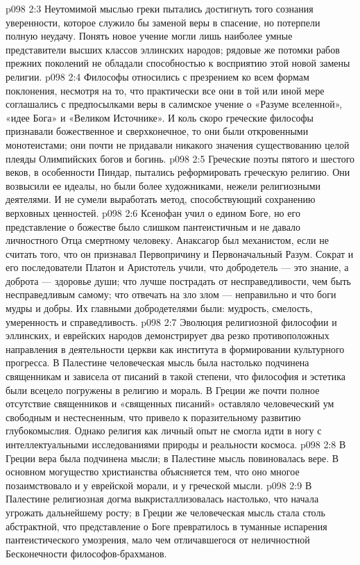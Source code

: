 \vs p098 2:3 Неутомимой мыслью греки пытались достигнуть того сознания уверенности, которое служило бы заменой веры в спасение, но потерпели полную неудачу. Понять новое учение могли лишь наиболее умные представители высших классов эллинских народов; рядовые же потомки рабов прежних поколений не обладали способностью к восприятию этой новой замены религии.
\vs p098 2:4 \pc Философы относились с презрением ко всем формам поклонения, несмотря на то, что практически все они в той или иной мере соглашались с предпосылками веры в салимское учение о «Разуме вселенной», «идее Бога» и «Великом Источнике». И коль скоро греческие философы признавали божественное и сверхконечное, то они были откровенными монотеистами; они почти не придавали никакого значения существованию целой плеяды Олимпийских богов и богинь.
\vs p098 2:5 Греческие поэты пятого и шестого веков, в особенности Пиндар, пытались реформировать греческую религию. Они возвысили ее идеалы, но были более художниками, нежели религиозными деятелями. И не сумели выработать метод, способствующий сохранению верховных ценностей.
\vs p098 2:6 Ксенофан учил о едином Боге, но его представление о божестве было слишком пантеистичным и не давало личностного Отца смертному человеку. Анаксагор был механистом, если не считать того, что он признавал Первопричину и Первоначальный Разум. Сократ и его последователи Платон и Аристотель учили, что добродетель --- это знание, а доброта --- здоровье души; что лучше пострадать от несправедливости, чем быть несправедливым самому; что отвечать на зло злом --- неправильно и что боги мудры и добры. Их главными добродетелями были: мудрость, смелость, умеренность и справедливость.
\vs p098 2:7 \pc Эволюция религиозной философии и эллинских, и еврейских народов демонстрирует два резко противоположных направления в деятельности церкви как института в формировании культурного прогресса. В Палестине человеческая мысль была настолько подчинена священникам и зависела от писаний в такой степени, что философия и эстетика были всецело погружены в религию и мораль. В Греции же почти полное отсутствие священников и «священных писаний» оставляло человеческий ум свободным и нестесненным, что привело к поразительному развитию глубокомыслия. Однако религия как личный опыт не смогла идти в ногу с интеллектуальными исследованиями природы и реальности космоса.
\vs p098 2:8 В Греции вера была подчинена мысли; в Палестине мысль повиновалась вере. В основном могущество христианства объясняется тем, что оно многое позаимствовало и у еврейской морали, и у греческой мысли.
\vs p098 2:9 В Палестине религиозная догма выкристаллизовалась настолько, что начала угрожать дальнейшему росту; в Греции же человеческая мысль стала столь абстрактной, что представление о Боге превратилось в туманные испарения пантеистического умозрения, мало чем отличавшегося от неличностной Бесконечности философов\hyp{}брахманов.
